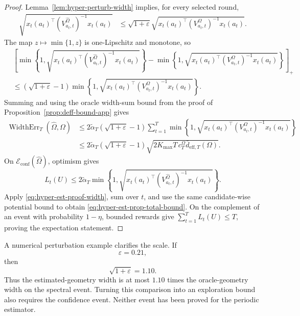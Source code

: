 \documentclass{article} %
\begin{document}
\begin{proof}
Lemma~\ref{lem:hyper-perturb-width} implies, for every selected round,
\begin{align}
\label{eq:hyper-est-proof-width}
\sqrt{
x_t(a_t)^\top
\left(V_{a_t,t}^{\widehat{\Omega}}\right)^{-1}
x_t(a_t)
}
&\le
\sqrt{1+\varepsilon}
\sqrt{
x_t(a_t)^\top
\left(V_{a_t,t}^{\Omega}\right)^{-1}
x_t(a_t)
}.
\end{align}
The map \(z\mapsto \min\{1,z\}\) is one-Lipschitz and monotone, so
\begin{align}
\label{eq:hyper-est-proof-min-diff}
&
\left[
\min\!\left\{
1,
\sqrt{
x_t(a_t)^\top
\left(V_{a_t,t}^{\widehat{\Omega}}\right)^{-1}
x_t(a_t)
}
\right\}
-
\min\!\left\{
1,
\sqrt{
x_t(a_t)^\top
\left(V_{a_t,t}^{\Omega}\right)^{-1}
x_t(a_t)
}
\right\}
\right]_{+}
\\
&\le
\left(\sqrt{1+\varepsilon}-1\right)
\min\!\left\{
1,
\sqrt{
x_t(a_t)^\top
\left(V_{a_t,t}^{\Omega}\right)^{-1}
x_t(a_t)
}
\right\}.
\end{align}
Summing and using the oracle width-sum bound from the proof of Proposition~\ref{prop:deff-bound-app} gives
\begin{align}
\label{eq:hyper-est-proof-err}
\operatorname{WidthErr}_T(\widehat{\Omega},\Omega)
&\le
2\widetilde\alpha_T
\left(\sqrt{1+\varepsilon}-1\right)
\sum_{t=1}^{T}
\min\!\left\{
1,
\sqrt{
x_t(a_t)^\top
\left(V_{a_t,t}^{\Omega}\right)^{-1}
x_t(a_t)
}
\right\}
\\
&\le
2\widetilde\alpha_T
\left(\sqrt{1+\varepsilon}-1\right)
\sqrt{
2K_{\max}T\,c_T^\Omega
\bar d_{\mathrm{eff},T}(\Omega)
}.
\end{align}
On \(\mathcal E_{\mathrm{conf}}(\widehat\Omega)\), optimism gives
\[
L_t(U)
\le
2\widetilde\alpha_T
\min\!\left\{
1,
\sqrt{
x_t(a_t)^\top
\left(V_{a_t,t}^{\widehat\Omega}\right)^{-1}
x_t(a_t)
}
\right\}.
\]
Apply \eqref{eq:hyper-est-proof-width}, sum over \(t\), and use the same
candidate-wise potential bound to obtain
\eqref{eq:hyper-est-prop-total-bound}. On the complement of an event with
probability \(1-\eta\), bounded rewards give
\(\sum_{t=1}^T L_t(U)\le T\), proving the expectation statement.
\end{proof}

A numerical perturbation example clarifies the scale.  If
\begin{equation}
\label{eq:hyper-est-example-eps}
\varepsilon=0.21,
\end{equation}
then
\begin{equation}
\label{eq:hyper-est-example-sqrt}
\sqrt{1+\varepsilon}=1.10 .
\end{equation}
Thus the estimated-geometry width is at most \(1.10\) times the
oracle-geometry width on the spectral event. Turning this comparison into an
exploration bound also requires the confidence event. Neither event has been
proved for the periodic estimator.
\end{document}
